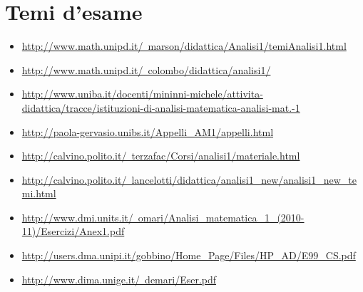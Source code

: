 \documentclass[a4paper,10pt]{article}
\begin{document}
\section{Temi d'esame}
\begin{itemize}
 \item \href{http://www.math.unipd.it/~marson/didattica/Analisi1/temiAnalisi1.html}{http://www.math.unipd.it/~marson/didattica/Analisi1/temiAnalisi1.html}
 \item \href{http://www.math.unipd.it/~colombo/didattica/analisi1/}{http://www.math.unipd.it/~colombo/didattica/analisi1/}
 \item \href{http://www.uniba.it/docenti/mininni-michele/attivita-didattica/tracce/istituzioni-di-analisi-matematica-analisi-mat.-1}{http://www.uniba.it/docenti/mininni-michele/attivita-didattica/tracce/istituzioni-di-analisi-matematica-analisi-mat.-1}
 \item \href{http://paola-gervasio.unibs.it/Appelli_AM1/appelli.html}{http://paola-gervasio.unibs.it/Appelli_AM1/appelli.html}
 \item \href{http://calvino.polito.it/~terzafac/Corsi/analisi1/materiale.html}{http://calvino.polito.it/~terzafac/Corsi/analisi1/materiale.html}
 \item \href{http://calvino.polito.it/~lancelotti/didattica/analisi1_new/analisi1_new_temi.html}{http://calvino.polito.it/~lancelotti/didattica/analisi1_new/analisi1_new_temi.html}
 \item \href{http://www.dmi.units.it/~omari/Analisi_matematica_1_(2010-11)/Esercizi/Anex1.pdf}{http://www.dmi.units.it/~omari/Analisi_matematica_1_(2010-11)/Esercizi/Anex1.pdf}
 \item \href{http://users.dma.unipi.it/gobbino/Home_Page/Files/HP_AD/E99_CS.pdf}{http://users.dma.unipi.it/gobbino/Home_Page/Files/HP_AD/E99_CS.pdf}
 \item \href{http://www.dima.unige.it/~demari/Eser.pdf}{http://www.dima.unige.it/~demari/Eser.pdf}
\end{itemize}
\end{document}
